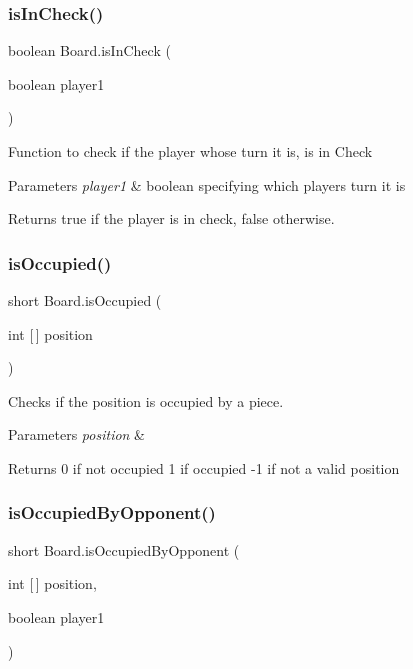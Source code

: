 \subsubsection{\texorpdfstring{is\+In\+Check()}{isInCheck()}}
{\footnotesize\ttfamily boolean Board.\+is\+In\+Check (\begin{DoxyParamCaption}\item[{boolean}]{player1 }\end{DoxyParamCaption})}

Function to check if the player whose turn it is, is in \textquotesingle{}Check\textquotesingle{} 
\begin{DoxyParams}{Parameters}
{\em player1} & boolean specifying which player\textquotesingle{}s turn it is \\
\hline
\end{DoxyParams}
\begin{DoxyReturn}{Returns}
true if the player is in check, false otherwise. 
\end{DoxyReturn}
\mbox{\label{class_board_a74571b89bb29e12e8db706c6a8c7705b}} 
\subsubsection{\texorpdfstring{is\+Occupied()}{isOccupied()}}
{\footnotesize\ttfamily short Board.\+is\+Occupied (\begin{DoxyParamCaption}\item[{int \mbox{[}$\,$\mbox{]}}]{position }\end{DoxyParamCaption})}

Checks if the position is occupied by a piece. 
\begin{DoxyParams}{Parameters}
{\em position} & \\
\hline
\end{DoxyParams}
\begin{DoxyReturn}{Returns}
0 if not occupied 1 if occupied -\/1 if not a valid position 
\end{DoxyReturn}
\mbox{\label{class_board_a279849fba32fb36350e9dc06cdccb3f5}} 
\subsubsection{\texorpdfstring{is\+Occupied\+By\+Opponent()}{isOccupiedByOpponent()}}
{\footnotesize\ttfamily short Board.\+is\+Occupied\+By\+Opponent (\begin{DoxyParamCaption}\item[{int \mbox{[}$\,$\mbox{]}}]{position,  }\item[{boolean}]{player1 }\end{DoxyParamCaption})}

